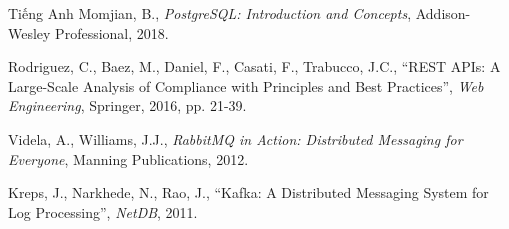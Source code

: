 \documentclass{uetgraduation}
\begin{document}
\begin{thebibliography}{9}
\begin{bibsection}{Tiếng Anh}
        Momjian, B.,
        \textit{PostgreSQL: Introduction and Concepts},
        Addison-Wesley Professional, 2018.

        Rodriguez, C., Baez, M., Daniel, F., Casati, F., Trabucco, J.C.,
        ``REST APIs: A Large-Scale Analysis of Compliance with Principles and Best Practices'',
        \textit{Web Engineering},
        Springer, 2016, pp. 21-39.

        Videla, A., Williams, J.J.,
        \textit{RabbitMQ in Action: Distributed Messaging for Everyone},
        Manning Publications, 2012.

        Kreps, J., Narkhede, N., Rao, J.,
        ``Kafka: A Distributed Messaging System for Log Processing'',
        \textit{NetDB},
        2011.
    \end{bibsection}
\end{thebibliography}
\end{document}
